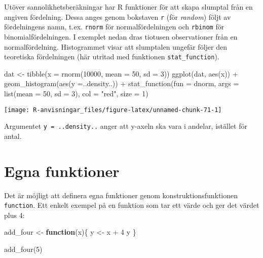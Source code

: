 \documentclass[
]{book}
\newenvironment{Shaded}{\begin{snugshade}}{\end{snugshade}}
\newcommand{\AttributeTok}[1]{\textcolor[rgb]{0.77,0.63,0.00}{#1}}
\newcommand{\ControlFlowTok}[1]{\textcolor[rgb]{0.13,0.29,0.53}{\textbf{#1}}}
\newcommand{\DecValTok}[1]{\textcolor[rgb]{0.00,0.00,0.81}{#1}}
\newcommand{\FunctionTok}[1]{\textcolor[rgb]{0.00,0.00,0.00}{#1}}
\newcommand{\NormalTok}[1]{#1}
\newcommand{\OtherTok}[1]{\textcolor[rgb]{0.56,0.35,0.01}{#1}}
\newcommand{\SpecialCharTok}[1]{\textcolor[rgb]{0.00,0.00,0.00}{#1}}
\newcommand{\StringTok}[1]{\textcolor[rgb]{0.31,0.60,0.02}{#1}}
\theoremstyle{definition}
\theoremstyle{definition}
\theoremstyle{definition}
\theoremstyle{definition}
\theoremstyle{remark}
\begin{document}
Utöver sannolikhetsberäkningar har R funktioner för att skapa slumptal från en angiven fördelning. Dessa anges genom bokstaven \texttt{r} (för \emph{random}) följt av fördelningens namn, t.ex. \texttt{rnorm} för normalfördelningen och \texttt{rbinom} för binomialfördelningen. I exemplet nedan dras tiotusen observationer från en normalfördelning. Histogrammet visar att slumptalen ungefär följer den teoretiska fördelningen (här utritad med funktionen \texttt{stat\_function}).

\begin{Shaded}
\begin{Highlighting}[]
\NormalTok{dat }\OtherTok{\textless{}{-}} \FunctionTok{tibble}\NormalTok{(}\AttributeTok{x =} \FunctionTok{rnorm}\NormalTok{(}\DecValTok{10000}\NormalTok{, }\AttributeTok{mean =} \DecValTok{50}\NormalTok{, }\AttributeTok{sd =} \DecValTok{3}\NormalTok{))}
\FunctionTok{ggplot}\NormalTok{(dat, }\FunctionTok{aes}\NormalTok{(x)) }\SpecialCharTok{+}
  \FunctionTok{geom\_histogram}\NormalTok{(}\FunctionTok{aes}\NormalTok{(}\AttributeTok{y =}\NormalTok{..density..)) }\SpecialCharTok{+}
  \FunctionTok{stat\_function}\NormalTok{(}\AttributeTok{fun =}\NormalTok{ dnorm, }\AttributeTok{args =} \FunctionTok{list}\NormalTok{(}\AttributeTok{mean =} \DecValTok{50}\NormalTok{, }\AttributeTok{sd =} \DecValTok{3}\NormalTok{), }
                \AttributeTok{col =} \StringTok{"red"}\NormalTok{, }\AttributeTok{size =} \DecValTok{1}\NormalTok{)}
\end{Highlighting}
\end{Shaded}

\begin{center}\texttt{[image: R-anvisningar\_files/figure-latex/unnamed-chunk-71-1]} \end{center}

Argumentet \texttt{y\ =\ ..density..} anger att y-axeln ska vara i andelar, istället för antal.

\hypertarget{egna-funktioner}{%
\section{Egna funktioner}\label{egna-funktioner}}

Det är möjligt att definera egna funktioner genom konstruktionsfunktionen \texttt{function}. Ett enkelt exempel på en funktion som tar ett värde och ger det värdet plus 4:

\begin{Shaded}
\begin{Highlighting}[]
\NormalTok{add\_four }\OtherTok{\textless{}{-}} \ControlFlowTok{function}\NormalTok{(x)\{}
\NormalTok{  y }\OtherTok{\textless{}{-}}\NormalTok{ x }\SpecialCharTok{+} \DecValTok{4}
\NormalTok{  y}
\NormalTok{\}}

\FunctionTok{add\_four}\NormalTok{(}\DecValTok{5}\NormalTok{)}
\end{Highlighting}
\end{Shaded}
\end{document}
